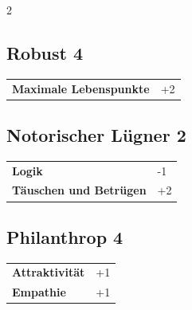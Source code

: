 \begin{multicols}{2}
\begin{tcolorbox}

\end{tcolorbox}

\begin{tcolorbox}
    \subsection*{Robust \hfill \small{4 }}
    \tcblower




\begin{tabular}{@{}ll@{}}
    \textbf{Maximale Lebenspunkte} & +2\\
\end{tabular}


\end{tcolorbox}

\begin{tcolorbox}
    \subsection*{Notorischer Lügner \hfill \small{2 }}
    \tcblower




\begin{tabular}{@{}ll@{}}
    \textbf{Logik} & -1\\
    \textbf{Täuschen und Betrügen} & +2\\
\end{tabular}


\end{tcolorbox}

\begin{tcolorbox}
    \subsection*{Philanthrop \hfill \small{4 }}
    \tcblower




\begin{tabular}{@{}ll@{}}
    \textbf{Attraktivität} & +1\\
    \textbf{Empathie} & +1\\
\end{tabular}


\end{tcolorbox}
\end{multicols}
